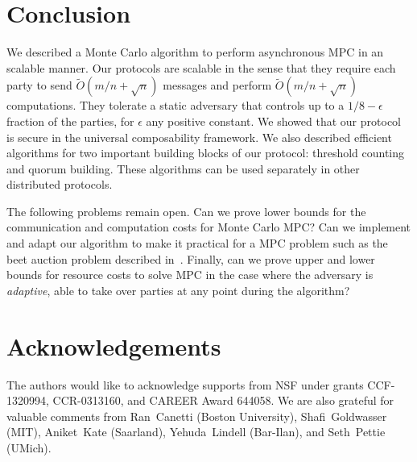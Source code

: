 \documentclass[11pt,letter]{article}
\theoremstyle{mytheoremstyle}
\newcommand{\fbad}{1/8\xspace}
\begin{document}
\section{Conclusion} \label{sec:end}
We described a Monte Carlo algorithm to perform asynchronous MPC in an scalable manner. Our protocols are scalable in the sense that they require each party to send $\tilde{O}(m/n + \sqrt n)$ messages and perform $\tilde{O}(m/n + \sqrt n)$ computations. They tolerate a static adversary that controls up to a $\fbad-\epsilon$ fraction of the parties, for $\epsilon$ any positive constant. We showed that our protocol is secure in the universal composability framework.
We also described efficient algorithms for two important building blocks of our protocol: threshold counting and quorum building. These algorithms can be used separately in other distributed protocols.

The following problems remain open. Can we prove lower bounds for the communication and computation costs for Monte Carlo MPC?  Can we implement and adapt our algorithm to make it practical for a MPC problem such as the beet auction problem described in~\cite{bogetoft2009secure}. Finally, can we prove upper and lower bounds for resource costs to solve MPC in the case where the adversary is \emph{adaptive}, able to take over parties at any point during the algorithm?

\section*{Acknowledgements}
The authors would like to acknowledge supports from NSF under grants CCF-1320994, CCR-0313160, and CAREER Award 644058. We are also grateful for valuable comments from Ran~Canetti (Boston University), Shafi~Goldwasser (MIT), Aniket~Kate (Saarland), Yehuda~Lindell (Bar-Ilan), and Seth~Pettie (UMich).



\end{document}
